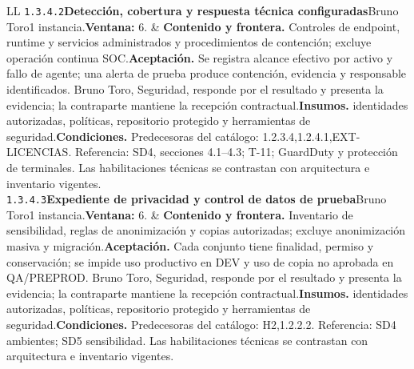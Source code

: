 \begin{longtable}{L{\tabcolsep\relax}L{\tabcolsep\relax}}
\texttt{1.\allowbreak{}3.\allowbreak{}4.\allowbreak{}2}\newline{}\textbf{Detección, cobertura y respuesta técnica configuradas}\newline{}Bruno Toro\newline{}1 instancia.\newline{}\textbf{Ventana:} 6. & \textbf{Contenido y frontera.} Controles de endpoint, runtime y servicios administrados y procedimientos de contención; excluye operación continua SOC.\newline{}\textbf{Aceptación.} Se registra alcance efectivo por activo y fallo de agente; una alerta de prueba produce contención, evidencia y responsable identificados. Bruno Toro, Seguridad, responde por el resultado y presenta la evidencia; la contraparte mantiene la recepción contractual.\newline{}\textbf{Insumos.} identidades autorizadas, políticas, repositorio protegido y herramientas de seguridad.\newline{}\textbf{Condiciones.} Predecesoras del catálogo: 1.2.3.4,1.2.4.1,EXT-LICENCIAS. Referencia: SD4, secciones 4.1--4.3; T-11; GuardDuty y protección de terminales. Las habilitaciones técnicas se contrastan con arquitectura e inventario vigentes.\\\hline
\texttt{1.\allowbreak{}3.\allowbreak{}4.\allowbreak{}3}\newline{}\textbf{Expediente de privacidad y control de datos de prueba}\newline{}Bruno Toro\newline{}1 instancia.\newline{}\textbf{Ventana:} 6. & \textbf{Contenido y frontera.} Inventario de sensibilidad, reglas de anonimización y copias autorizadas; excluye anonimización masiva y migración.\newline{}\textbf{Aceptación.} Cada conjunto tiene finalidad, permiso y conservación; se impide uso productivo en DEV y uso de copia no aprobada en QA/PREPROD. Bruno Toro, Seguridad, responde por el resultado y presenta la evidencia; la contraparte mantiene la recepción contractual.\newline{}\textbf{Insumos.} identidades autorizadas, políticas, repositorio protegido y herramientas de seguridad.\newline{}\textbf{Condiciones.} Predecesoras del catálogo: H2,1.2.2.2. Referencia: SD4 ambientes; SD5 sensibilidad. Las habilitaciones técnicas se contrastan con arquitectura e inventario vigentes.\\\hline

\end{longtable}
